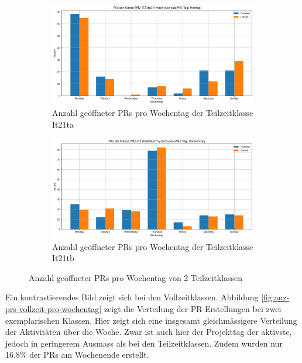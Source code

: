 \begin{figure}[htbp]
    \centering
    \begin{subfigure}[b]{0.48\textwidth}
        \centering
        \includegraphics[width=\textwidth]{Figures/pr-klasse-per-wochentag-it21ta.png}
         \caption{Anzahl geöffneter PRs pro Wochentag der Teilzeitklasse It21ta}
        \label{fig:anzahl-prs-pro-wochentag-it21ta}
    \end{subfigure}
    \hfill
    \begin{subfigure}[b]{0.48\textwidth}
        \centering
        \includegraphics[width=\textwidth]{Figures/pr-klasse-per-wochentag-21tb.png}
         \caption{Anzahl geöffneter PRs pro Wochentag der Teilzeitklasse It21tb}
        \label{fig:anzahl-prs-pro-wochentag-it21tb}
    \end{subfigure}
    \caption{Anzahl geöffneter PRs pro Wochentag von 2 Teilzeitklassen}
    \label{fig:anz-prs-teilzeit-pro-wochentag}
\end{figure}

Ein kontrastierendes Bild zeigt sich bei den Vollzeitklassen. Abbildung \autoref{fig:anz-prs-vollzeit-pro-wochentag} zeigt die Verteilung der PR-Erstellungen bei zwei exemplarischen Klassen. 
Hier zeigt sich eine insgesamt gleichmässigere Verteilung der Aktivitäten über die Woche. Zwar ist auch hier der Projekttag der aktivste, jedoch in geringerem Ausmass als bei den Teilzeitklassen. Zudem wurden nur 16.8\% der PRs am Wochenende erstellt.

